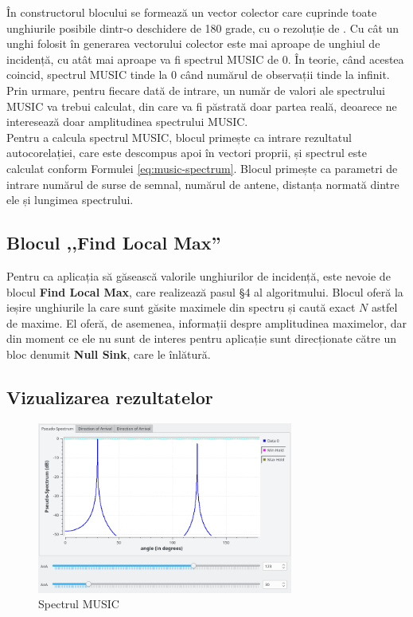 În constructorul blocului se formează un vector colector care cuprinde toate
unghiurile posibile dintr-o deschidere de 180 grade, cu o rezoluție de
. Cu cât un unghi folosit în generarea vectorului
colector este mai aproape de unghiul de incidență, cu atât mai aproape va fi
spectrul MUSIC de 0. În teorie, când acestea coincid, spectrul MUSIC tinde la 0
când numărul de observații tinde la infinit. Prin urmare, pentru fiecare dată de
intrare, un număr de  valori ale spectrului MUSIC va
trebui calculat, din care va fi păstrată doar partea reală, deoarece ne
interesează doar amplitudinea spectrului MUSIC. \\

Pentru a calcula spectrul MUSIC, blocul primește ca intrare rezultatul
autocorelației, care este descompus apoi în vectori proprii, și spectrul este
calculat conform Formulei \eqref{eq:music-spectrum}. Blocul primește ca
parametri de intrare numărul de surse de semnal, numărul de antene, distanța
normată dintre ele și lungimea spectrului.

\subsection{Blocul ,,Find Local Max''}
Pentru ca aplicația să găsească valorile unghiurilor de incidență, este nevoie
de blocul \textbf{Find Local Max}, care realizează pasul \S4 al algoritmului.
Blocul oferă la ieșire unghiurile la care sunt găsite maximele din spectru și
caută exact $N$ astfel de maxime. El oferă, de asemenea, informații despre
amplitudinea maximelor, dar din moment ce ele nu sunt de interes pentru
aplicație sunt direcționate către un bloc denumit \textbf{Null Sink}, care le
înlătură.

\subsection{Vizualizarea rezultatelor}
\begin{figure}[h]
    \centering
    \includegraphics[width=0.75\textwidth]{src/img/grc-doa-spectrum}
    \caption{Spectrul MUSIC}
    \label{fig:doa-sp}
\end{figure}

